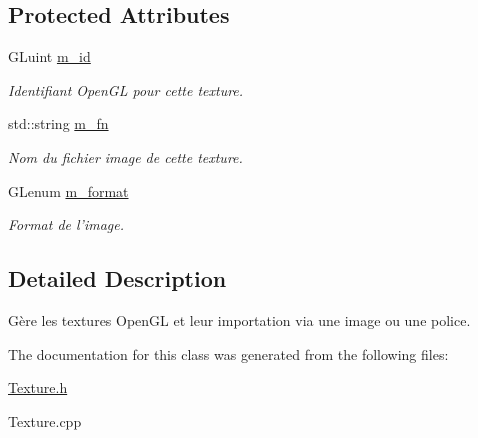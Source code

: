 \subsection*{Protected Attributes}
\begin{DoxyCompactItemize}
\item 
\hypertarget{classTexture_acc091a7a07abe75c263544eaeec44664}{G\-Luint \hyperlink{classTexture_acc091a7a07abe75c263544eaeec44664}{m\-\_\-id}}\label{classTexture_acc091a7a07abe75c263544eaeec44664}

\begin{DoxyCompactList}\small\item\em Identifiant Open\-G\-L pour cette texture. \end{DoxyCompactList}\item 
\hypertarget{classTexture_a9a0d5c5fadadbca3595e46958cc88838}{std\-::string \hyperlink{classTexture_a9a0d5c5fadadbca3595e46958cc88838}{m\-\_\-fn}}\label{classTexture_a9a0d5c5fadadbca3595e46958cc88838}

\begin{DoxyCompactList}\small\item\em Nom du fichier image de cette texture. \end{DoxyCompactList}\item 
\hypertarget{classTexture_a00dc4aaa74b0e979f4f7be844a349c62}{G\-Lenum \hyperlink{classTexture_a00dc4aaa74b0e979f4f7be844a349c62}{m\-\_\-format}}\label{classTexture_a00dc4aaa74b0e979f4f7be844a349c62}

\begin{DoxyCompactList}\small\item\em Format de l'image. \end{DoxyCompactList}\end{DoxyCompactItemize}


\subsection{Detailed Description}
Gère les textures Open\-G\-L et leur importation via une image ou une police. 

The documentation for this class was generated from the following files\-:\begin{DoxyCompactItemize}
\item 
\hyperlink{Texture_8h}{Texture.\-h}\item 
Texture.\-cpp\end{DoxyCompactItemize}

